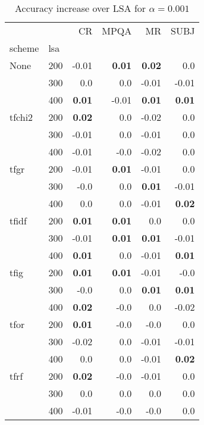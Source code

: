 \begin{table}[H]
\begin{center}

\begin{tabular}{ll|rrrr}
\toprule
   &   &   CR &  MPQA &   MR &  SUBJ \\
scheme & lsa &        &        &        &        \\
\midrule
None & 200 &     -0.01 & \textbf{0.01} & \textbf{0.02} &      0.0 \\
   & 300 &      0.0 &      0.0 &     -0.01 &     -0.01 \\
   & 400 & \textbf{0.01} &     -0.01 & \textbf{0.01} & \textbf{0.01} \\
tfchi2 & 200 & \textbf{0.02} &      0.0 &     -0.02 &      0.0 \\
   & 300 &     -0.01 &      0.0 &     -0.01 &      0.0 \\
   & 400 &     -0.01 &     -0.0 &     -0.02 &      0.0 \\
tfgr & 200 &     -0.01 & \textbf{0.01} &     -0.01 &      0.0 \\
   & 300 &     -0.0 &      0.0 & \textbf{0.01} &     -0.01 \\
   & 400 &      0.0 &      0.0 &     -0.01 & \textbf{0.02} \\
tfidf & 200 & \textbf{0.01} & \textbf{0.01} &      0.0 &      0.0 \\
   & 300 &     -0.01 & \textbf{0.01} & \textbf{0.01} &     -0.01 \\
   & 400 & \textbf{0.01} &      0.0 &     -0.01 & \textbf{0.01} \\
tfig & 200 & \textbf{0.01} & \textbf{0.01} &     -0.01 &     -0.0 \\
   & 300 &     -0.0 &      0.0 & \textbf{0.01} & \textbf{0.01} \\
   & 400 & \textbf{0.02} &     -0.0 &      0.0 &     -0.02 \\
tfor & 200 & \textbf{0.01} &     -0.0 &     -0.0 &      0.0 \\
   & 300 &     -0.02 &      0.0 &     -0.01 &     -0.01 \\
   & 400 &      0.0 &      0.0 &     -0.01 & \textbf{0.02} \\
tfrf & 200 & \textbf{0.02} &     -0.0 &     -0.01 &      0.0 \\
   & 300 &      0.0 &      0.0 &      0.0 &      0.0 \\
   & 400 &     -0.01 &     -0.0 &     -0.0 &      0.0 \\
\bottomrule
\end{tabular}

\caption[Accuracy increase over LSA for $\alpha=0.001$]{Accuracy increase over LSA for $\alpha=0.001$}
\label{tab:batch:results0.001}
\end{center}
\end{table}







